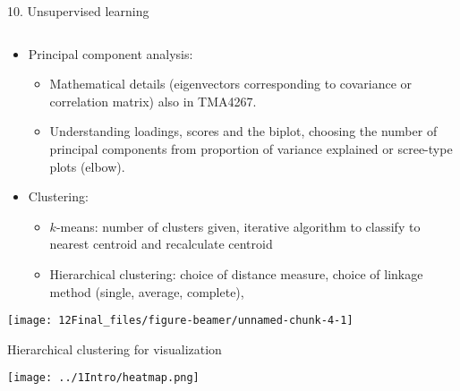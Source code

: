 \documentclass[10pt,ignorenonframetext,]{beamer}
\providecommand{\tightlist}{%
  \setlength{\itemsep}{0pt}\setlength{\parskip}{0pt}}
\begin{document}
\begin{frame}

\begin{block}{10. Unsupervised learning}

\(~\)

\begin{itemize}
\tightlist
\item
  Principal component analysis:

  \begin{itemize}
  \tightlist
  \item
    Mathematical details (eigenvectors corresponding to covariance or
    correlation matrix) also in TMA4267.
  \item
    Understanding loadings, scores and the biplot, choosing the number
    of principal components from proportion of variance explained or
    scree-type plots (elbow).
  \end{itemize}
\end{itemize}

\vspace{2mm}

\begin{itemize}
\tightlist
\item
  Clustering:

  \begin{itemize}
  \tightlist
  \item
    \(k\)-means: number of clusters given, iterative algorithm to
    classify to nearest centroid and recalculate centroid
  \item
    Hierarchical clustering: choice of distance measure, choice of
    linkage method (single, average, complete),
  \end{itemize}
\end{itemize}

\end{block}

\end{frame}

\begin{frame}

\centering

\texttt{[image: 12Final\_files/figure-beamer/unnamed-chunk-4-1]}

\end{frame}

\begin{frame}

Hierarchical clustering for visualization

\centering

\texttt{[image: ../1Intro/heatmap.png]}

\end{frame}
\end{document}
